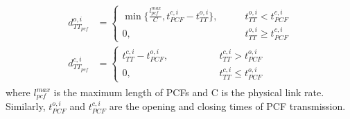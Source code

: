 \documentclass[electronics,article,accept,moreauthors,pdftex]{Definitions/mdpi}
\begin{document}
\begin{gather}
\begin{align}
	d^{o,i}_{TT_{pcf}}&=\begin{cases}
	\min \{ \frac{l^{max}_{pcf}}C, t^{c,i}_{PCF} - t^{o,i}_{TT}\},
	\qquad &  t^{o,i}_{TT} < t^{c,i}_{PCF}\\
	0, \qquad &  t^{o,i}_{TT} \geq t^{c,i}_{PCF}
\end{cases}\\
	d^{c,i}_{TT_{pcf}}&=\begin{cases}
	t^{c,i}_{TT} - t^{o,i}_{PCF} ,
    \qquad ~~~~~~~~~~~&  t^{c,i}_{TT} > t^{o,i}_{PCF}\\
	0, \qquad ~~~~~~~~&  t^{c,i}_{TT} \leq t^{o,i}_{PCF}
\end{cases}
\end{align}
\end{gather}
where $l^{max}_{pcf}$ is the maximum length of PCFs and C is the physical link rate. Similarly, $t^{o,i}_{PCF}$ and $t^{c,i}_{PCF}$ are the opening and closing times of PCF transmission.
\end{document}
